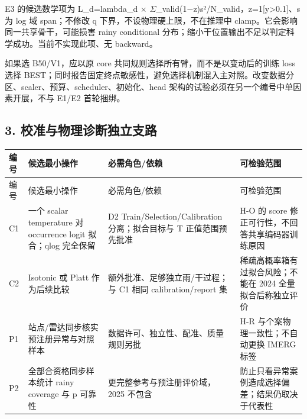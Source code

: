 \documentclass[UTF8,fontset=fandol,10pt]{ctexart}
\begin{document}
E3 的候选数学项为 L\_\allowbreak{}d=lambda\_\allowbreak{}d \(\times\) \(\Sigma\)\_\allowbreak{}valid(1\(-\)z)s²/\allowbreak{}N\_\allowbreak{}valid，z=1[y>0.1]、s 为 log 域 span；不修改 q 下界，不设物理硬上限，不在推理中 clamp。它会影响同一共享骨干，可能损害 rainy conditional 分布；缩小干位置输出不足以判定科学成功。当前不实现此项、无 backward。

如果选 B50/\allowbreak{}V1，应以原 core 共同规则选择所有臂，而不是以变动后的训练 loss 选择 BEST；同时报告固定终点敏感性，避免选择机制混入主对照。改变数据分区、scaler、预算、scheduler、初始化、head 架构的试验必须在另一个编号中单因素开展，不与 E1/\allowbreak{}E2 首轮捆绑。

\subsection{3. 校准与物理诊断独立支路}

\begingroup\small\setlength{\tabcolsep}{3pt}\renewcommand{\arraystretch}{1.12}
\begin{longtable}{>{\raggedright\arraybackslash}p{\dimexpr(\linewidth-8\tabcolsep)/4\relax}>{\raggedright\arraybackslash}p{\dimexpr(\linewidth-8\tabcolsep)/4\relax}>{\raggedright\arraybackslash}p{\dimexpr(\linewidth-8\tabcolsep)/4\relax}>{\raggedright\arraybackslash}p{\dimexpr(\linewidth-8\tabcolsep)/4\relax}}
\toprule
编号 & 候选最小操作 & 必需角色/\allowbreak{}依赖 & 可检验范围 \\
\midrule\endfirsthead
编号 & 候选最小操作 & 必需角色/\allowbreak{}依赖 & 可检验范围 \\
\midrule\endhead
C1 & 一个 scalar temperature 对 occurrence logit 拟合；qlog 完全保留 & D2 Train/\allowbreak{}Selection/\allowbreak{}Calibration 分离；拟合目标与 T 正值范围预先批准 & H-O 的 score 修正可行性，不回答共享编码器训练原因 \\
C2 & Isotonic 或 Platt 作为后续比较 & 额外批准、足够独立雨/\allowbreak{}干过程；与 C1 相同 calibration/\allowbreak{}report 集 & 稀疏高概率箱有过拟合风险；不能在 2024 全量拟合后称独立评价 \\
P1 & 站点/\allowbreak{}雷达同步核实预注册异常与对照样本 & 数据许可、独立性、配准、质量规则另批 & H-R 与个案物理一致性；不自动更换 IMERG 标签 \\
P2 & 全部合资格同步样本统计 rainy coverage 与 p 可靠性 & 更完整参考与预注册评价域，2025 不包含 & 防止只看异常案例造成选择偏差；结果仍取决于代表性 \\
\bottomrule\end{longtable}\endgroup
\end{document}
